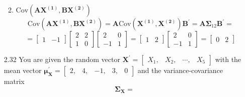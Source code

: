 \begin{enumerate}[font=\bfseries]
\begin{enumerate}
\[            \]
            \item $\text{Cov}\left(\mathbf{A}\mathbf{X^{(1)}}, \mathbf{B}\mathbf{X^{(2)}}\right)$
            \[
                \text{Cov}\left(\mathbf{A}\mathbf{X^{(1)}}, \mathbf{B}\mathbf{X^{(2)}}\right)
                =
                \mathbf{A}\text{Cov}\left(\mathbf{X^{(1)}}, \mathbf{X^{(2)}}\right)\mathbf{B}^\prime
                =
                \mathbf{A}\mathbf{\Sigma}_{12}\mathbf{B}^\prime
                =
            \]
            \[
                =
                \begin{bmatrix}
                    1 & -1
                \end{bmatrix}
                \begin{bmatrix}
                    2 & 2 \\
                    1 & 0
                \end{bmatrix}
                \begin{bmatrix}
                    2 & 0 \\
                    -1 & 1
                \end{bmatrix}
                =
                \begin{bmatrix}
                    1 & 2
                \end{bmatrix}
                \begin{bmatrix}
                    2 & 0 \\
                    -1 & 1
                \end{bmatrix}
                =
                \begin{bmatrix}
                    0 & 2
                \end{bmatrix}
            \]
        \end{enumerate}
        \item[2.32] You are given the random vector $\mathbf{X}^\prime = \begin{bmatrix}
            X_1, & X_2, & \cdots, & X_5
        \end{bmatrix}$ with the mean vector $\bm{\mu}_\mathbf{X}^\prime = \begin{bmatrix}
            2, & 4, & -1, & 3, & 0
        \end{bmatrix}$ and the variance-covariance matrix
        \[
            \bm{\Sigma}_{\mathbf{X}}
            =
\]
\end{enumerate}
